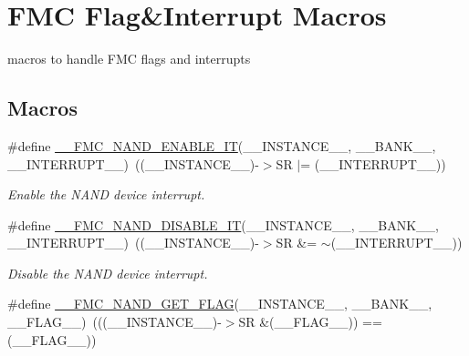 \hypertarget{group___f_m_c___l_l___flag___interrupt___macros}{}\section{F\+MC Flag\&Interrupt Macros}
\label{group___f_m_c___l_l___flag___interrupt___macros}


macros to handle F\+MC flags and interrupts  


\subsection*{Macros}
\begin{DoxyCompactItemize}
\item 
\#define \hyperlink{group___f_m_c___l_l___flag___interrupt___macros_ga5f9a33c729df22a3c698bf0378a6b33a}{\+\_\+\+\_\+\+F\+M\+C\+\_\+\+N\+A\+N\+D\+\_\+\+E\+N\+A\+B\+L\+E\+\_\+\+IT}(\+\_\+\+\_\+\+I\+N\+S\+T\+A\+N\+C\+E\+\_\+\+\_\+,  \+\_\+\+\_\+\+B\+A\+N\+K\+\_\+\+\_\+,  \+\_\+\+\_\+\+I\+N\+T\+E\+R\+R\+U\+P\+T\+\_\+\+\_\+)~((\+\_\+\+\_\+\+I\+N\+S\+T\+A\+N\+C\+E\+\_\+\+\_\+)-\/$>$SR $\vert$= (\+\_\+\+\_\+\+I\+N\+T\+E\+R\+R\+U\+P\+T\+\_\+\+\_\+))
\begin{DoxyCompactList}\small\item\em Enable the N\+A\+ND device interrupt. \end{DoxyCompactList}\item 
\#define \hyperlink{group___f_m_c___l_l___flag___interrupt___macros_gab221145b137dc9c0f9af406baf7a7256}{\+\_\+\+\_\+\+F\+M\+C\+\_\+\+N\+A\+N\+D\+\_\+\+D\+I\+S\+A\+B\+L\+E\+\_\+\+IT}(\+\_\+\+\_\+\+I\+N\+S\+T\+A\+N\+C\+E\+\_\+\+\_\+,  \+\_\+\+\_\+\+B\+A\+N\+K\+\_\+\+\_\+,  \+\_\+\+\_\+\+I\+N\+T\+E\+R\+R\+U\+P\+T\+\_\+\+\_\+)~((\+\_\+\+\_\+\+I\+N\+S\+T\+A\+N\+C\+E\+\_\+\+\_\+)-\/$>$SR \&= $\sim$(\+\_\+\+\_\+\+I\+N\+T\+E\+R\+R\+U\+P\+T\+\_\+\+\_\+))
\begin{DoxyCompactList}\small\item\em Disable the N\+A\+ND device interrupt. \end{DoxyCompactList}\item 
\#define \hyperlink{group___f_m_c___l_l___flag___interrupt___macros_ga2d5410e74f47125ccd059b590c250aaa}{\+\_\+\+\_\+\+F\+M\+C\+\_\+\+N\+A\+N\+D\+\_\+\+G\+E\+T\+\_\+\+F\+L\+AG}(\+\_\+\+\_\+\+I\+N\+S\+T\+A\+N\+C\+E\+\_\+\+\_\+,  \+\_\+\+\_\+\+B\+A\+N\+K\+\_\+\+\_\+,  \+\_\+\+\_\+\+F\+L\+A\+G\+\_\+\+\_\+)~(((\+\_\+\+\_\+\+I\+N\+S\+T\+A\+N\+C\+E\+\_\+\+\_\+)-\/$>$SR \&(\+\_\+\+\_\+\+F\+L\+A\+G\+\_\+\+\_\+)) == (\+\_\+\+\_\+\+F\+L\+A\+G\+\_\+\+\_\+))

\end{DoxyCompactItemize}

